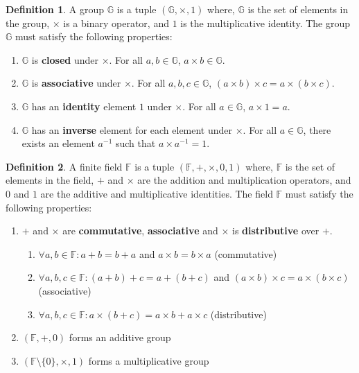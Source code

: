 \documentclass[twoside,11pt]{report}
\theoremstyle{definition}
\newtheorem{definition}{Definition}[section]
\theoremstyle{plain}
\begin{document}
\begin{definition}\label{def:group}
  A group $\mathbb{G}$ is a tuple $(\mathbb{G}, \times, 1)$ where, $\mathbb{G}$ is the set of elements in the group, $\times$ is a binary operator, and $1$ is the multiplicative identity. The group $\mathbb{G}$ must satisfy the following properties:
  \begin{enumerate}
    \item $\mathbb{G}$ is \textbf{closed} under $\times$. For all $a,b \in \mathbb{G}$, $a \times b \in \mathbb{G}$.
    \item $\mathbb{G}$ is \textbf{associative} under $\times$. For all $a,b,c \in \mathbb{G}$, $(a \times b) \times c = a \times (b \times c)$.
    \item $\mathbb{G}$ has an \textbf{identity} element $1$ under $\times$. For all $a \in \mathbb{G}$, $a \times 1 = a$.
    \item $\mathbb{G}$ has an \textbf{inverse} element for each element under $\times$. For all $a \in \mathbb{G}$, there exists an element $a^{-1}$ such that $a \times a^{-1} = 1$.
  \end{enumerate}
\end{definition}

\begin{definition}\label{def:field}
  A finite field $\mathbb{F}$ is a tuple $(\mathbb{F}, +, \times, 0, 1)$ where, $\mathbb{F}$ is the set of elements in the field, $+$ and $\times$ are the addition and multiplication operators, and $0$ and $1$ are the additive and multiplicative identities. The field $\mathbb{F}$ must satisfy the following properties:
  \begin{enumerate}
    \item  $+$ and $\times$ are \textbf{commutative}, \textbf{associative} and $\times$ is \textbf{distributive} over $+$.
          \begin{enumerate}
            \item $\forall a,b \in \mathbb{F}: a + b = b + a$ and $a \times b = b \times a$ (commutative)
            \item $\forall a,b,c \in \mathbb{F}: (a + b) + c = a + (b + c)$ and $(a \times b) \times c = a \times (b \times c)$ (associative)
            \item $\forall a,b,c \in \mathbb{F}: a \times (b + c) = a \times b + a \times c$ (distributive)
          \end{enumerate}
    \item $(\mathbb{F}, +, 0)$ forms an additive group
    \item $(\mathbb{F} \setminus \{0{\}}, \times, 1)$ forms a multiplicative group
  \end{enumerate}
\end{definition}
\end{document}
